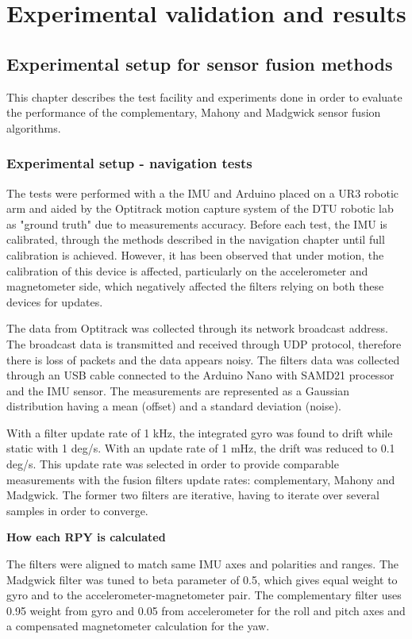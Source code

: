\chapter{Experimental validation and results}
\section{Experimental setup for sensor fusion methods}

This chapter describes the test facility and experiments done in order to evaluate the performance of the complementary, Mahony and Madgwick sensor fusion algorithms.

\subsection{Experimental setup - navigation tests}

The tests were performed with a the IMU and Arduino placed on a UR3 robotic arm and aided by the Optitrack motion capture system of the DTU robotic lab as "ground truth" due to measurements accuracy. 
Before each test, the IMU is calibrated, through the methods described in the navigation chapter until full calibration is achieved. However, it has been observed that under motion, the calibration of this device is affected, particularly on the accelerometer and magnetometer side, which negatively affected the filters relying on both these devices for updates. 

The data from Optitrack was collected through its network broadcast address. The broadcast data is transmitted and received through UDP protocol, therefore there is loss of packets and the data appears noisy. 
The filters data was collected through an USB cable connected to the Arduino Nano with SAMD21 processor and the IMU sensor. The measurements are represented as a Gaussian distribution having a mean (offset) and a standard deviation (noise). 

With a filter update rate of 1 kHz, the integrated gyro was found to drift while static with 1 deg/s. With an update rate of 1 mHz, the drift was reduced to 0.1 deg/s. This update rate was selected in order to provide comparable measurements with the fusion filters update rates: complementary, Mahony and Madgwick. The former two filters are iterative, having to iterate over several samples in order to converge. 

\textbf{How each RPY is calculated}

The filters were aligned to match same IMU axes and polarities and ranges. The Madgwick filter was tuned to beta parameter of 0.5, which gives equal weight to gyro and to the accelerometer-magnetometer pair. The complementary filter uses 0.95 weight from gyro and 0.05 from accelerometer for the roll and pitch axes and a compensated magnetometer calculation for the yaw. 



